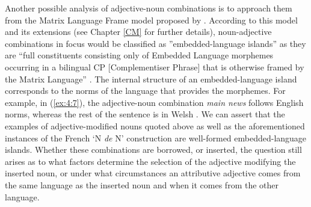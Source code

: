Another possible analysis of adjective-noun combinations is to approach them from the Matrix Language Frame model proposed by \citet{myers-scotton-duelling-1993}. According to this model and its extensions (see Chapter \ref{CM} for further details), noun-adjective combinations in focus would be classified as ''embedded-language islands'' as they are ``full constituents consisting only of Embedded Language morphemes occurring in a bilingual CP [Complementiser Phrase] that is otherwise framed by the Matrix Language'' \citep[139]{myers-scotton-contact-2002}. The internal structure of an embedded-language island corresponds to the norms of the language that provides the morphemes. For example, in (\ref{ex:4:7}), the adjective-noun combination \textit{main news} follows English norms, whereas the rest of the sentence is in Welsh \citep[cf.][261]{deuchar-congruence-2005}. We can assert that the examples of adjective-modified nouns quoted above as well as the aforementioned instances of the French `N \textit{de} N' construction are well-formed embedded-language islands. Whether these combinations are borrowed, or inserted, the question still arises as to what factors determine the selection of the adjective modifying the inserted noun, or under what circumstances an attributive adjective comes from the same language as the inserted noun and when it comes from the other language.

